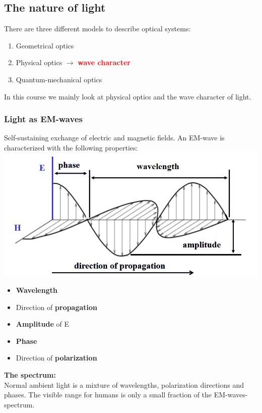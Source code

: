 \documentclass[a4paper, fontsize=8pt, landscape, DIV=1]{scrartcl}
\begin{document}
\begin{multicols*}{4}
		\subsection{The nature of light}
		There are three different models to describe optical systems: 
		\begin{enumerate}[noitemsep]
			\item Geometrical optics
			\item Physical optics $\rightarrow$ \textcolor{red}{\textbf{wave character}}   
			\item Quantum-mechanical optics
		\end{enumerate}
		In this course we mainly look at physical optics and the wave character of light. 		
		\subsubsection{Light as EM-waves}
		Self-sustaining exchange of electric and magnetic fields. An EM-wave is characterized with the following properties: 
		\includegraphics[width=\columnwidth]{images/Introduction/em_wave.png}			
			\begin{itemize}[noitemsep]
				\item \textbf{Wavelength}
				\item Direction of \textbf{propagation}
				\item \textbf{Amplitude} of E
				\item \textbf{Phase} 
				\item Direction of \textbf{polarization }
			\end{itemize}
		\textbf{The spectrum:}\\
		Normal ambient light is a mixture of wavelengths, polarization directions and phases. The visible range for humans is only a small fraction of the EM-waves-spectrum.\\
		\begin{center}

\end{center}
\end{multicols*}
\end{document}
